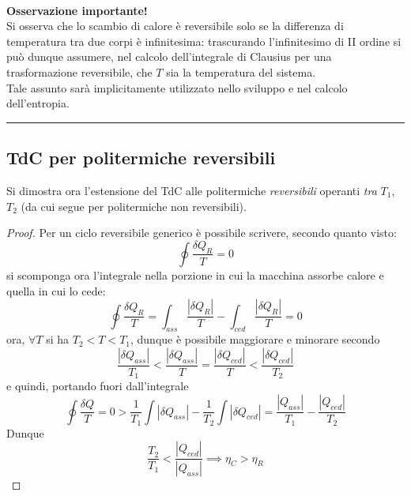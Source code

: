 \documentclass[10pt, oneside]{book}
\newcommand{\infobox}[2]{\vspace{0.5cm}~\\ \textbf{#1} \hrulefill \vspace{0.2cm}\\#2 {}\,\\\hrule \vspace{0.5cm}}
\begin{document}
\infobox{Osservazione importante!}{
Si osserva che lo scambio di calore è reversibile solo se la differenza di temperatura tra due corpi è infinitesima: trascurando l'infinitesimo di II ordine si può dunque assumere, nel calcolo dell'integrale di Clausius per una trasformazione reversibile, che $T$ sia la temperatura del sistema.\\
Tale assunto sarà implicitamente utilizzato nello sviluppo e nel calcolo dell'entropia.
}

\subsection{TdC per politermiche reversibili}
Si dimostra ora l'estensione del TdC alle politermiche \textit{reversibili} operanti \textit{tra} $T_1$, $T_2$ (da cui segue per politermiche non reversibili).\\
\begin{proof}
Per un ciclo reversibile generico è possibile scrivere, secondo quanto visto:
\[\oint \frac{\delta Q_R}{T} = 0\]
si scomponga ora l'integrale nella porzione in cui la macchina assorbe calore e quella in cui lo cede:
\[\oint \frac{\delta Q_R}{T} = \int_{ass} \frac{|\delta Q_R|}{T} - \int_{ced} \frac{|\delta Q_R|}{T} = 0\]
ora, $\forall T$ si ha $T_2 < T < T_1$, dunque è possibile maggiorare e minorare secondo
\[\frac{|\delta Q_{ass}|}{T_1} < \frac{|\delta Q_{ass}|}{T} = \frac{|\delta Q_{ced}|}{T} < \frac{|\delta Q_{ced}|}{T_2}\]
e quindi, portando fuori dall'integrale
\[\oint \frac{\delta Q}{T} = 0 > \frac{1}{T_1} \int |\delta Q_{ass}| - \frac{1}{T_2} \int |\delta Q_{ced}| = \frac{|Q_{ass}|}{T_1} - \frac{|Q_{ced}|}{T_2}\]
Dunque 
\[\frac{T_2}{T_1} < \frac{|Q_{ced}|}{|Q_{ass}|} \implies \eta_C > \eta_R\]
\end{proof}
\end{document}

